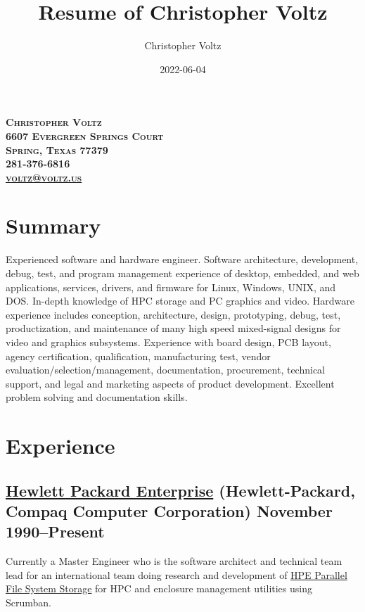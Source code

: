 \documentclass[10pt,letterpaper,oneside]{report}
\title{Resume of Christopher Voltz}
\author{Christopher Voltz}
\date{2022-06-04}
\begin{document}
\begin{center}
  \textbf{
    \textsc{
      Christopher Voltz\\
      6607 Evergreen Springs Court\\
      Spring, Texas 77379\\
      281-376-6816\\
      \href{mailto:voltz@voltz.us?subject=Resume}{voltz@voltz.us}
    }
  }
\end{center}

\section{Summary}

Experienced software and hardware engineer. Software architecture, development,
debug, test, and program management experience of desktop, embedded, and web
applications, services, drivers, and firmware for Linux, Windows, UNIX, and DOS.
In-depth knowledge of HPC storage and PC graphics and video. Hardware
experience includes conception, architecture, design, prototyping, debug, test,
productization, and maintenance of many high speed mixed-signal designs for
video and graphics subsystems. Experience with board design, PCB layout, agency
certification, qualification, manufacturing test, vendor
evaluation/selection/management, documentation, procurement, technical support,
and legal and marketing aspects of product development. Excellent problem
solving and documentation skills.

\section{Experience}

\subsection[Hewlett Packard Enterprise]{
  \href{http://www.hpe.com/}{Hewlett Packard Enterprise}
  {\footnotesize (Hewlett-Packard, Compaq Computer Corporation)}
  \hfill November 1990--Present
}

\vspace{-1.5ex}

Currently a Master Engineer who is the software architect and technical team
lead for an international team doing research and development of
{\href{https://www.hpe.com/psnow/doc/a50002561enw.pdf?jumpid=in_pdp-psnow-qs}{HPE
Parallel File System Storage}} for HPC and enclosure management utilities using
Scrumban.
\end{document}
